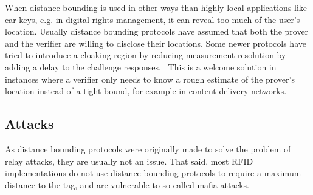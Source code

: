 When distance bounding is used in other ways than highly local applications like car keys, e.g. in digital rights management, it can reveal too much of the user's location. Usually distance bounding protocols have assumed that both the prover and the verifier are willing to disclose their locations. Some newer protocols have tried to introduce a cloaking region by reducing measurement resolution by adding a delay to the challenge responses.~\cite{Molina-Martinez2018-nw} This is a welcome solution in instances where a verifier only needs to know a rough estimate of the prover's location instead of a tight bound, for example in content delivery networks.

\subsection{Attacks}
As distance bounding protocols were originally made to solve the problem of relay attacks, they are usually not an issue. That said, most RFID implementations do not use distance bounding protocols to require a maximum distance to the tag, and are vulnerable to so called mafia attacks.~\cite{Nikov_undated-vv}